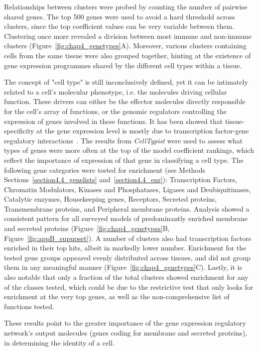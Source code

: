 Relationships between clusters were probed by counting the number of pairwise shared genes. The top 500 genes were used to avoid a hard threshold across clusters, since the top coefficient values can be very variable between them. Clustering once more revealed a division between most immune and non-immune clusters (Figure~\ref{fig:chap4_genetypes}A). Moreover, various clusters containing cells from the same tissue were also grouped together, hinting at the existence of gene expression programmes shared by the different cell types within a tissue.

The concept of "cell type" is still inconclusively defined, yet it can be intimately related to a cell's molecular phenotype, i.e. the molecules driving cellular function. These drivers can either be the effector molecules directly responsible for the cell's array of functions, or the genomic regulators controlling the expression of genes involved in these functions. It has been showed that tissue-specificity at the gene expression level is mostly due to transcription factor-gene regulatory interactions~\citep{sonawane_understanding_2017}. The results from \textit{CellTypist} were used to assess what types of genes were more often at the top of the model coefficient rankings, which reflect the importance of expression of that gene in classifying a cell type. The following gene categories were tested for enrichment (see Methods Sections~\ref{section4.4_genelists} and~\ref{section4.4_enr}): Transcription Factors, Chromatin Modulators, Kinases and Phosphatases, Ligases and Deubiquitinases, Catalytic enzymes, Housekeeping genes, Receptors, Secreted proteins, Transmembrane proteins, and Peripheral membrane proteins. Analysis showed a consistent pattern for all surveyed models of predominantly enriched membrane and secreted proteins (Figure~\ref{fig:chap4_genetypes}B, Figure~\ref{fig:appB_supupset}). A number of clusters also had transcription factors enriched in their top hits, albeit in markedly lower number. Enrichment for the tested gene groups appeared evenly distributed across tissues, and did not group them in any meaningful manner (Figure~\ref{fig:chap4_genetypes}C). Lastly, it is also notable that only a fraction of the total clusters showed enrichment for any of the classes tested, which could be due to the restrictive test that only looks for enrichment at the very top genes, as well as the non-comprehensive list of functions tested.

These results point to the greater importance of the gene expression regulatory network's output molecules (genes coding for membrane and secreted proteins), in determining the identity of a cell.


